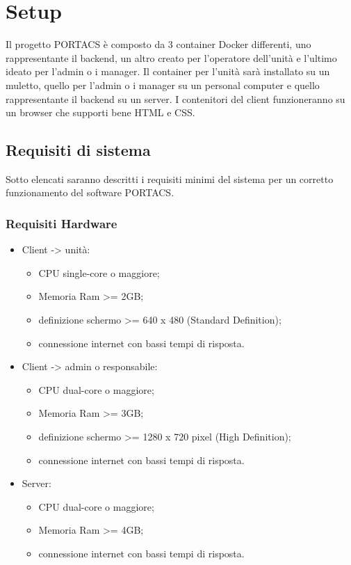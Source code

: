 \section{Setup}
Il progetto PORTACS è composto da 3 container Docker differenti, uno rappresentante il backend, un altro creato per l'operatore dell'unità e l'ultimo ideato per l'admin o i manager. Il container per l'unità sarà installato su un muletto, quello per l'admin o i manager su un personal computer e quello rappresentante il backend su un server. I contenitori del client funzioneranno su un browser che supporti bene HTML e CSS.


\subsection{Requisiti di sistema}
Sotto elencati saranno descritti i requisiti minimi del sistema per un corretto funzionamento del software PORTACS.


\subsubsection{Requisiti Hardware}
\begin{itemize}
	\item Client -> unità:
\begin{itemize}
	\item CPU single-core o maggiore;
	\item Memoria Ram >= 2GB;
	\item definizione schermo >= 640 x 480 (Standard Definition);
	\item connessione internet con bassi tempi di risposta.
\end{itemize}
	\item Client -> admin o responsabile:
\begin{itemize}
	\item CPU dual-core o maggiore;
	\item Memoria Ram >= 3GB;
	\item definizione schermo >= 1280 x 720 pixel (High Definition);
	\item connessione internet con bassi tempi di risposta.
\end{itemize}
	\item Server:
\begin{itemize}
	\item CPU dual-core o maggiore;
	\item Memoria Ram >= 4GB;
	\item connessione internet con bassi tempi di risposta.
\end{itemize}
\end{itemize}

